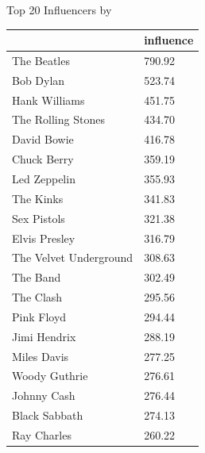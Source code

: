\documentclass[12pt]{article}  %
\begin{document}
\begin{minipage}{\textwidth}
\begin{minipage}[t]{0.45\textwidth}
\begin{tabular}{ll}
            \hline\hline
    \end{tabular}
  \end{minipage}
  \begin{minipage}[t]{0.45\textwidth}
   \centering
        \makeatletter{}\makeatother\caption{Top 20 Influencers by }\label{tab:Top20}
         \begin{tabular}{ll}        
            \hline\hline
            \rowcolor[rgb]{0.663, 0.816, 0.557}{name}          & influence \\
            \hline
            \rowcolor[rgb]{0.886, 0.937, 0.855}The Beatles            & 790.92  \\
            Bob Dylan              & 523.74   \\
            \rowcolor[rgb]{0.886, 0.937, 0.855}Hank Williams          & 451.75  \\
            The Rolling Stones     & 434.70  \\
            \rowcolor[rgb]{0.886, 0.937, 0.855}David Bowie            & 416.78   \\
            Chuck Berry            & 359.19   \\
            \rowcolor[rgb]{0.886, 0.937, 0.855}Led Zeppelin           & 355.93  \\
            The Kinks              & 341.83  \\
            \rowcolor[rgb]{0.886, 0.937, 0.855}Sex Pistols            & 321.38  \\
            Elvis Presley          & 316.79  \\
            \rowcolor[rgb]{0.886, 0.937, 0.855}The Velvet Underground & 308.63 \\
            The Band               & 302.49  \\
            \rowcolor[rgb]{0.886, 0.937, 0.855}The Clash              & 295.56 \\
            Pink Floyd             & 294.44  \\
            \rowcolor[rgb]{0.886, 0.937, 0.855}Jimi Hendrix           & 288.19 \\
            Miles Davis            & 277.25  \\
            \rowcolor[rgb]{0.886, 0.937, 0.855}Woody Guthrie          & 276.61 \\
            Johnny Cash            & 276.44  \\
            \rowcolor[rgb]{0.886, 0.937, 0.855}Black Sabbath          & 274.13  \\
            Ray Charles           & 260.22 \\
            \hline\hline
      \end{tabular}
   \end{minipage}
\end{minipage}
\end{document}
